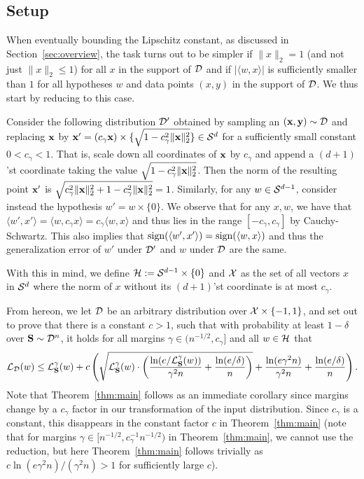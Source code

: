 \subsection{Setup}
\label{sec:reduct}
When eventually bounding the Lipschitz constant, as discussed in Section~\ref{sec:overview}, the task turns out to be simpler if $\|x\|_2=1$ (and not just $\|x\|_2 \leq 1$) for all $x$ in the support of $\mathcal{D}$ and if $|\langle w,x\rangle|$ is sufficiently smaller than $1$ for all hypotheses $w$ and data points $(x,y)$ in the support of $\mathcal{D}$. We thus start by reducing to this case. 

Consider the following distribution $\mathcal{D}'$ obtained by sampling an $(\mathbf{x},\mathbf{y}) \sim \mathcal{D}$ and replacing $\mathbf{x}$ by $\mathbf{x}'=(c_\gamma \mathbf{x}) \times \{ \sqrt{1-c_\gamma^2\|\mathbf{x}\|_2^2}\} \in \mathcal{S}^d$ for a sufficiently small constant $0 < c_\gamma < 1$. That is, scale down all coordinates of $\mathbf{x}$ by $c_\gamma$ and append a $(d+1)$'st coordinate taking the value $\sqrt{1-c_\gamma^2\|\mathbf{x}\|_2^2}$. Then the norm of the resulting point $\mathbf{x}'$ is $\sqrt{c_\gamma^2\|\mathbf{x}\|_2^2 + 1-c_\gamma^2\|\mathbf{x}\|_2^2} = 1$. Similarly, for any $w \in \mathcal{S}^{d-1}$, consider instead the hypothesis $w'=w \times \{0\}$. We observe that for any $x,w$, we have that $\langle w',x'\rangle = \langle w, c_\gamma x\rangle = c_\gamma\langle w, x \rangle$ and thus lies in the range $[-c_\gamma,c_\gamma]$ by Cauchy-Schwartz. This also implies that $\operatorname{sign}(\langle w', x'\rangle) = \operatorname{sign}(\langle w, x\rangle)$ and thus the generalization error of $w'$ under $\mathcal{D}'$ and $w$ under $\mathcal{D}$ are the same. 

With this in mind, we define $\mathcal{H} := \mathcal{S}^{d-1} \times \{0\}$ and $\mathcal{X}$ as the set of all vectors $x$ in $\mathcal{S}^d$ where the norm of $x$ without its $(d+1)$'st coordinate is at most $c_\gamma$.

From hereon, we let $\mathcal{D}$ be an arbitrary distribution over $\mathcal{X} \times \{-1,1\}$, and set out to prove that there is a constant $c>1$, such that with probability at least $1-\delta$ over $\mathbf{S} \sim \mathcal{D}^n$, it holds for all margins $\gamma \in (n^{-1/2}, c_\gamma]$ and all $w \in \mathcal{H}$ that
\begin{align}
\mathcal{L}_{\mathcal{D}}(w) \leq \mathcal{L}_{\mathbf{S}}^\gamma(w) + c \left(\sqrt{\mathcal{L}^{\gamma}_{\mathbf{S}}(w) \cdot \left( \frac{ \ln(e/\mathcal{L}^{\gamma}_{\mathbf{S}}(w))}{\gamma^2 n} + \frac{\ln(e/\delta)}{n} \right)} + \frac{\ln(e\gamma^2 n)}{\gamma^2 n} + \frac{\ln(e/\delta)}{n}  \right). \label{eq:maingoal}
\end{align}
Note that Theorem~\ref{thm:main} follows as an immediate corollary since margins change by a $c_\gamma$ factor in our transformation of the input distribution. Since $c_\gamma$ is a constant, this disappears in the constant factor $c$ in Theorem~\ref{thm:main} (note that for margins $\gamma \in [n^{-1/2}, c_\gamma^{-1} n^{-1/2})$ in Theorem~\ref{thm:main}, we cannot use the reduction, but here Theorem~\ref{thm:main} follows trivially as $c \ln(e \gamma^2 n)/(\gamma^2 n) > 1$ for sufficiently large $c$). 

